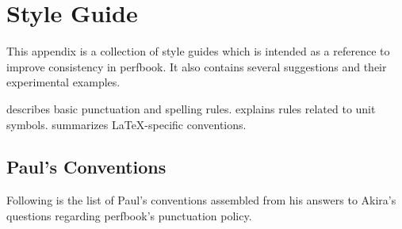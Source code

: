 
\chapter{Style Guide}
\label{chp:app:styleguide:Style Guide}
%

This appendix is a collection of style guides which is intended
as a reference to improve consistency in perfbook.
It also contains several suggestions and their experimental examples.

 describes basic
punctuation and spelling rules.
 explains rules
related to unit symbols.
 summarizes
\LaTeX-specific conventions.

\section{Paul's Conventions}
\label{sec:app:styleguide:Paul's Conventions}

Following is the list of Paul's conventions assembled from his
answers to Akira's questions regarding perfbook's punctuation policy.


